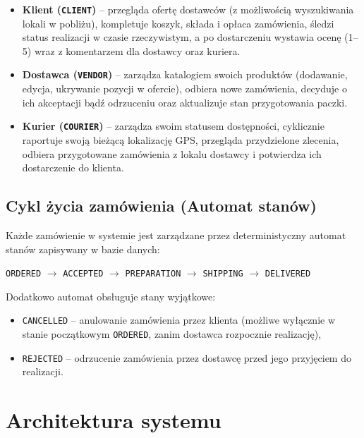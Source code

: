 \documentclass[11pt,a4paper]{article}
\begin{document}
\begin{itemize}
    \item \textbf{Klient (\texttt{CLIENT})} -- przegląda ofertę dostawców (z możliwością wyszukiwania lokali w pobliżu), kompletuje koszyk, składa i opłaca zamówienia, śledzi status realizacji w czasie rzeczywistym, a po dostarczeniu wystawia ocenę (1--5) wraz z komentarzem dla dostawcy oraz kuriera.
    \item \textbf{Dostawca (\texttt{VENDOR})} -- zarządza katalogiem swoich produktów (dodawanie, edycja, ukrywanie pozycji w ofercie), odbiera nowe zamówienia, decyduje o ich akceptacji bądź odrzuceniu oraz aktualizuje stan przygotowania paczki.
    \item \textbf{Kurier (\texttt{COURIER})} -- zarządza swoim statusem dostępności, cyklicznie raportuje swoją bieżącą lokalizację GPS, przegląda przydzielone zlecenia, odbiera przygotowane zamówienia z lokalu dostawcy i potwierdza ich dostarczenie do klienta.
\end{itemize}

\subsection{Cykl życia zamówienia (Automat stanów)}
Każde zamówienie w systemie jest zarządzane przez deterministyczny automat stanów zapisywany w bazie danych:
\begin{center}
    \texttt{ORDERED} $\rightarrow$ \texttt{ACCEPTED} $\rightarrow$ \texttt{PREPARATION} $\rightarrow$ \texttt{SHIPPING} $\rightarrow$ \texttt{DELIVERED}
\end{center}
Dodatkowo automat obsługuje stany wyjątkowe:
\begin{itemize}
    \item \texttt{CANCELLED} -- anulowanie zamówienia przez klienta (możliwe wyłącznie w stanie początkowym \texttt{ORDERED}, zanim dostawca rozpocznie realizację),
    \item \texttt{REJECTED} -- odrzucenie zamówienia przez dostawcę przed jego przyjęciem do realizacji.
\end{itemize}

\section{Architektura systemu}
\end{document}

